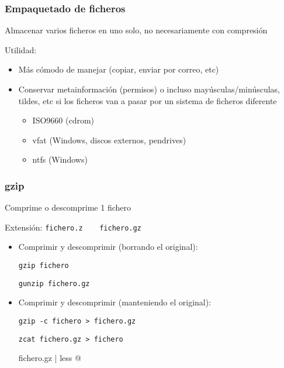 \documentclass[ucs]{beamer}
\begin{document}
\begin{frame}[fragile]
\frametitle{Empaquetado de ficheros}

Almacenar varios ficheros en uno solo, no necesariamente
con compresión

Utilidad:
\begin{itemize}
\item
Más cómodo de manejar (copiar, enviar por correo, etc)
\item
Conservar metainformación (permisos) o incluso mayúsculas/minúsculas, tildes, etc
si los ficheros van a pasar por un sistema de ficheros diferente
\begin{itemize}
\item
ISO9660 (cdrom)
\item
vfat (Windows, discos externos,   pendrives)
\item
ntfs (Windows)
\end{itemize}

\end{itemize}



\end{frame}
\begin{frame}[fragile]

\frametitle{gzip}


Comprime o descomprime 1 fichero

Extensión: \verb|fichero.z    fichero.gz|
\begin{itemize}	
\item
Comprimir y descomprimir (borrando el original):

\verb|gzip fichero |

\verb|gunzip fichero.gz|

\end{itemize}
\end{frame}
\begin{frame}[fragile]
\begin{itemize}
\item
Comprimir y descomprimir (manteniendo el original):

\verb|gzip -c fichero > fichero.gz   | 

\verb|zcat fichero.gz > fichero| 

\verb@zcat fichero.gz  | less @ 



\end{itemize}

\end{frame}
\end{document}

